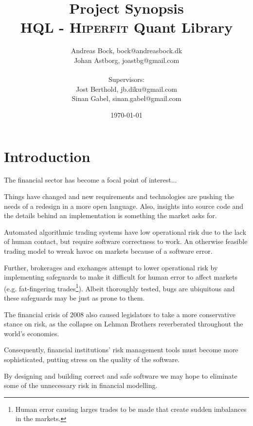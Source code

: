 \documentclass[11pt]{article}
\makeatletter
\def\Author{Andreas Bock, bock@andreasbock.dk\\
Johan Astborg, joastbg@gmail.com\\\\
Supervisors:\\
Jost Berthold, jb.diku@gmail.com\\
Sinan Gabel, sinan.gabel@gmail.com
}
\def\Title{\bf Project Synopsis\\ HQL - \textsc{Hiperfit} Quant Library}
\makeatother
\begin{document}
\title{\Title}
\author{\Author}
\date{\today}
\maketitle

\begin{abstract}


\end{abstract}

\section*{Introduction}

The financial sector has become a focal point of interest...

Things have changed and new requirements and technologies are pushing the needs
of a redesign in a more open language. Also, insights into source code and the
details behind an implementation is something the market asks for.

Automated algorithmic trading systems have low operational risk due to the lack
of human contact, but require software correctness to work. An otherwise feasible
trading model to wreak havoc on markets because of a software error.

Further, brokerages and exchanges attempt to lower operational risk by implementing
safeguards to make it difficult for human error to affect markets (e.g. fat-fingering
trades\footnote{Human error causing larges trades to be made that create sudden imbalances in the markets.}). Albeit thoroughly tested, bugs are ubiquitous and
these safeguards may be just as prone to them. 

The financial crisis of 2008 also caused legislators to take a more conservative
stance on risk, as the collapse on Lehman Brothers reverberated throughout
the world's economies.

Consequently, financial institutions' risk management tools must become more
sophisticated, putting stress on the quality of the software.

By designing and building correct and safe software we may hope to eliminate some
of the unnecessary risk in financial modelling.
\end{document}
